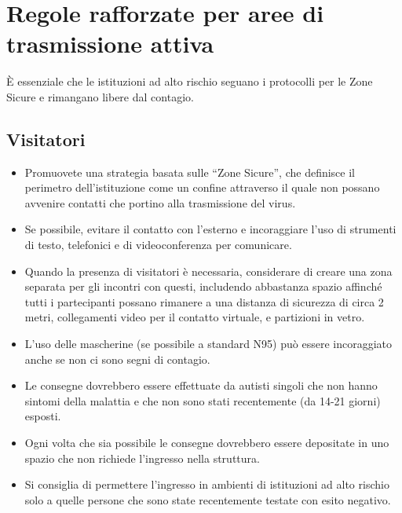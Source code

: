 \documentclass[onecolumn,journal]{IEEEtran}
\begin{document}
\begin{multicols}{2}
\begin{itemize}
\end{itemize}

\section*{Regole rafforzate per aree di trasmissione attiva}

È essenziale che le istituzioni ad alto rischio seguano i protocolli per le Zone Sicure e rimangano libere dal contagio.

\subsection*{Visitatori}

\begin{itemize}

  \item Promuovete una strategia basata sulle “Zone Sicure”, che definisce il perimetro dell’istituzione come un confine attraverso il quale non possano avvenire contatti che portino alla trasmissione del virus.

  \item Se possibile, evitare il contatto con l’esterno e incoraggiare l’uso di strumenti di testo, telefonici e di videoconferenza per comunicare.

  \item Quando la presenza di visitatori è necessaria, considerare di creare una zona separata per gli incontri con questi, includendo abbastanza spazio affinché tutti i partecipanti possano rimanere a una distanza di sicurezza di circa 2 metri, collegamenti video per il contatto virtuale, e partizioni in vetro.

  \item L’uso delle mascherine (se possibile a standard N95) può essere incoraggiato anche se non ci sono segni di contagio.

  \item Le consegne dovrebbero essere effettuate da autisti singoli che non hanno sintomi della malattia e che non sono stati recentemente (da 14-21 giorni) esposti.

  \item Ogni volta che sia possibile le consegne dovrebbero essere depositate in uno spazio che non richiede l’ingresso nella struttura.

  \item Si consiglia di permettere l’ingresso in ambienti di istituzioni ad alto rischio solo a quelle persone che sono state recentemente testate con esito negativo.


\end{itemize}
\end{multicols}
\end{document}
